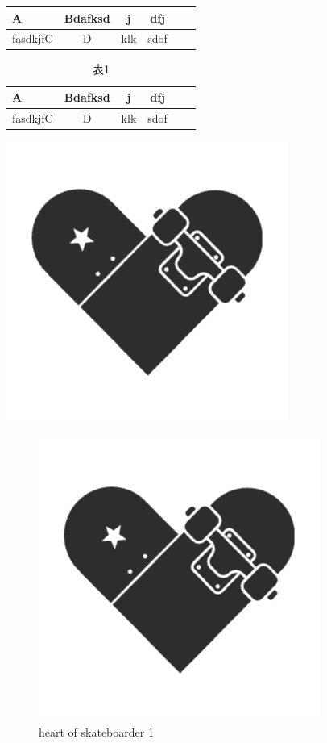 \begin{center}
\begin{tabular}{|m{2cm}<{\centering}|c|c|c|c|c}%
   \hline%
    {\cellcolor{blue!25}}A&Bdafksd&j&dfj\\
    \hline
   fasdkjfC&D&klk&sdof\\
\end{tabular}
\end{center}

\begin{table}%
    \centering
    \caption{表1}
    \begin{tabular}{|m{2cm}<{\centering}|c|c|c|c|c}%
        \hline%
         {\cellcolor{blue!25}}A&Bdafksd&j&dfj\\
         \hline
        fasdkjfC&D&klk&sdof\\
     \end{tabular}
\end{table}

\begin{center}
    \includegraphics[scale=0.6]{figure/logo.png}%
\end{center}

\begin{figure}%
    \centering
    \caption{heart of skateboarder 1}
    \includegraphics[scale=0.6]{figure/logo.png}
\end{figure}

